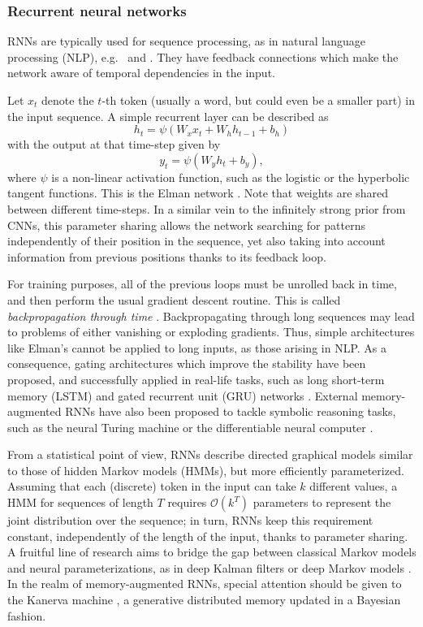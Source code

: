 \subsubsection{Recurrent neural networks} RNNs are typically used for sequence processing, as in natural language processing (NLP), e.g.\ \cite{hochreiter1997long} and \cite{chung2014empirical}. They have feedback connections which make the network aware of temporal dependencies in the input.

Let $x_t$ denote the $t$-th token (usually a word, but could even be 
a smaller part) in the input sequence. A simple recurrent layer can be described as
$$
h_t = \psi(W_x x_t + W_h h_{t-1} + b_h)
$$
with the output at that time-step given by
$$
y_t = \psi(W_y h_t + b_y),
$$
where $\psi$ is a non-linear activation function, such as the logistic or the hyperbolic tangent functions. This is the Elman network \cite{cruse2006neural}. Note that weights are shared between different time-steps. In a similar vein to the infinitely strong prior from CNNs, this parameter sharing allows the network searching for patterns independently of their position in the sequence, yet also taking into account information from previous positions thanks to its feedback loop.

For training purposes, all of the previous loops must be unrolled back in time, and then perform the usual gradient descent routine.
This is called \emph{backpropagation through time} \cite{58337}.
Backpropagating through long sequences may lead to problems
of either vanishing or exploding gradients. Thus, 
simple architectures like Elman's cannot be applied to long inputs, as those arising in NLP. 
As a consequence, gating architectures which improve the stability have been proposed, and successfully applied in real-life tasks,
such as long 
short-term memory (LSTM) \cite{hochreiter1997long} and gated recurrent unit (GRU) networks \cite{cho2014learning}. 
External memory-augmented RNNs have also been proposed to tackle symbolic reasoning tasks, such as the neural Turing machine \cite{graves2014neural} or the differentiable neural computer \cite{graves2016hybrid}.

From a statistical point of view, RNNs describe directed graphical models similar to those of hidden Markov models (HMMs), but more efficiently parameterized. Assuming that each (discrete) token in the input can take $k$ different values, a HMM for sequences of length $T$ requires $\mathcal{O}(k^T)$ parameters to represent
the joint distribution over the sequence; in turn, RNNs keep this requirement constant, independently of the length of the input, thanks to parameter sharing. A fruitful line of research aims to bridge the gap between classical Markov models and neural parameterizations, as in deep Kalman filters \cite{krishnan2015deep} or deep Markov models \cite{krishnan2016structured}. In the realm of memory-augmented RNNs, special attention should be given to the Kanerva machine \cite{wu2018kanerva}, a generative distributed memory updated in a Bayesian fashion.



